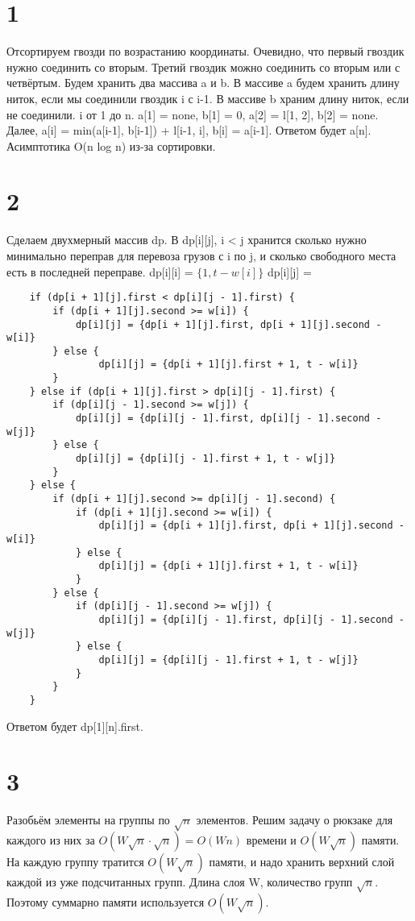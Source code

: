 \documentclass{extarticle}
\begin{document}
\section*{1}
Отсортируем гвозди по возрастанию координаты.
\newline
Очевидно, что первый гвоздик нужно соединить со вторым.
\newline
Третий гвоздик можно соединить со вторым или с четвёртым. Будем хранить два массива a и b. В массиве a будем хранить длину ниток, если мы соединили гвоздик i с i-1. В массиве b храним длину ниток, если не соединили. i от 1 до n. a[1] = none, b[1] = 0, a[2] = l[1, 2], b[2] = none. Далее, a[i] = min(a[i-1], b[i-1]) + l[i-1, i], b[i] = a[i-1]. Ответом будет a[n].
\newline
Асимптотика O(n log n) из-за сортировки.

\section*{2}
Сделаем двухмерный массив dp.
\newline
В dp[i][j], i < j хранится сколько нужно минимально переправ для перевоза грузов с i по j, и сколько свободного места есть в последней переправе.
\newline
dp[i][i] = $\{1, t - w[i]\}$
\newline
dp[i][j] =
\begin{lstlisting}
    if (dp[i + 1][j].first < dp[i][j - 1].first) {
        if (dp[i + 1][j].second >= w[i]) {
            dp[i][j] = {dp[i + 1][j].first, dp[i + 1][j].second - w[i]}
        } else {
                dp[i][j] = {dp[i + 1][j].first + 1, t - w[i]}
        }
    } else if (dp[i + 1][j].first > dp[i][j - 1].first) {
        if (dp[i][j - 1].second >= w[j]) {
            dp[i][j] = {dp[i][j - 1].first, dp[i][j - 1].second - w[j]}
        } else {
            dp[i][j] = {dp[i][j - 1].first + 1, t - w[j]}
        }
    } else {
        if (dp[i + 1][j].second >= dp[i][j - 1].second) {
            if (dp[i + 1][j].second >= w[i]) {
                dp[i][j] = {dp[i + 1][j].first, dp[i + 1][j].second - w[i]}
            } else {
                dp[i][j] = {dp[i + 1][j].first + 1, t - w[i]}
            }
        } else {
            if (dp[i][j - 1].second >= w[j]) {
                dp[i][j] = {dp[i][j - 1].first, dp[i][j - 1].second - w[j]}
            } else {
                dp[i][j] = {dp[i][j - 1].first + 1, t - w[j]}
            }
        }
    }
\end{lstlisting}
Ответом будет dp[1][n].first.

\section*{3}

Разобьём элементы на группы по $\sqrt{n}$ элементов. Решим задачу о рюкзаке для каждого из них за $O(W\sqrt{n} \cdot \sqrt{n}) = O(Wn)$ времени и $O(W\sqrt{n})$ памяти. На каждую группу тратится $O(W\sqrt{n})$ памяти, и надо хранить верхний слой каждой из уже подсчитанных групп. Длина слоя W, количество групп $\sqrt{n}$. Поэтому суммарно памяти используется $O(W\sqrt{n})$.
\end{document}
